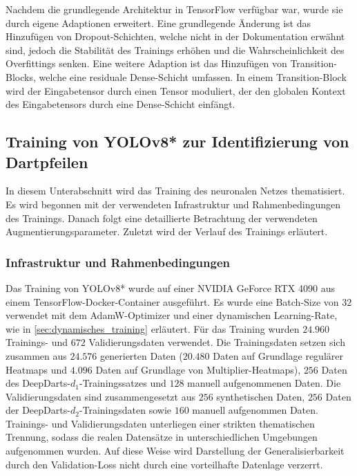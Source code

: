 Nachdem die grundlegende Architektur in TensorFlow verfügbar war, wurde sie durch eigene Adaptionen erweitert. Eine grundlegende Änderung ist das Hinzufügen von Dropout-Schichten, welche nicht in der Dokumentation erwähnt sind, jedoch die Stabilität des Trainings erhöhen und die Wahrscheinlichkeit des Overfittings senken. Eine weitere Adaption ist das Hinzufügen von Transition-Blocks, welche eine residuale Dense-Schicht umfassen. In einem Transition-Block wird der Eingabetensor durch einen Tensor moduliert, der den globalen Kontext des Eingabetensors durch eine Dense-Schicht einfängt.


\subsection{Training von YOLOv8* zur Identifizierung von Dartpfeilen}
\label{sec:training}

In diesem Unterabschnitt wird das Training des neuronalen Netzes thematisiert. Es wird begonnen mit der verwendeten Infrastruktur und Rahmenbedingungen des Trainings. Danach folgt eine detaillierte Betrachtung der verwendeten Augmentierungsparameter. Zuletzt wird der Verlauf des Trainings erläutert.

\subsubsection{Infrastruktur und Rahmenbedingungen}

Das Training von YOLOv8* wurde auf einer NVIDIA GeForce RTX 4090 aus einem TensorFlow-Docker-Container ausgeführt. Es wurde eine Batch-Size von $32$ verwendet mit dem AdamW-Optimizer und einer dynamischen Learning-Rate, wie in \autoref{sec:dynamisches_training} erläutert. Für das Training wurden $24.960$ Trainings- und $672$ Validierungsdaten verwendet. Die Trainingsdaten setzen sich zusammen aus $24.576$ generierten Daten ($20.480$ Daten auf Grundlage regulärer Heatmaps und $4.096$ Daten auf Grundlage von Multiplier-Heatmaps), $256$ Daten des DeepDarts-$d_1$-Trainingssatzes und $128$ manuell aufgenommenen Daten. Die Validierungsdaten sind zusammengesetzt aus $256$ synthetischen Daten, $256$ Daten der DeepDarts-$d_2$-Trainingsdaten sowie $160$ manuell aufgenommen Daten. Trainings- und Validierungsdaten unterliegen einer strikten thematischen Trennung, sodass die realen Datensätze in unterschiedlichen Umgebungen aufgenommen wurden. Auf diese Weise wird Darstellung der Generalisierbarkeit durch den Validation-Loss nicht durch eine vorteilhafte Datenlage verzerrt.

